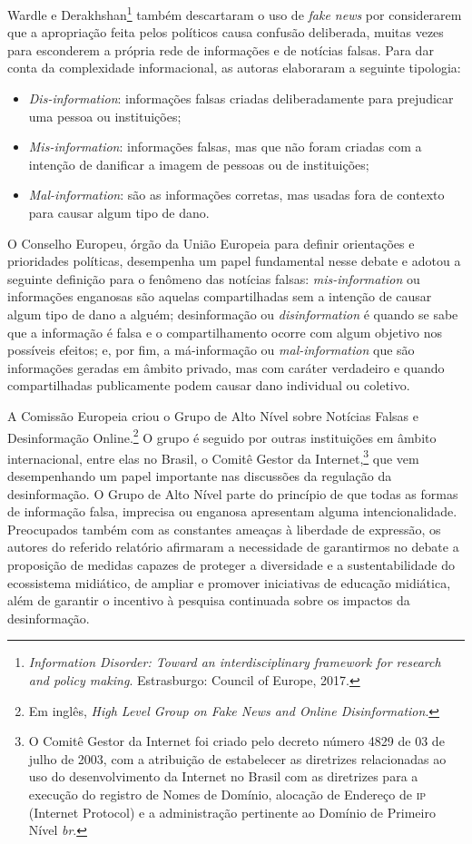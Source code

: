 Wardle e Derakhshan\footnote{\textit{Information
Disorder: Toward an interdisciplinary framework for research and policy
making}. Estrasburgo: Council of Europe, 2017.} também descartaram o uso de \textit{fake news}
por considerarem que a apropriação feita pelos políticos causa confusão
deliberada, muitas vezes para esconderem a própria rede de informações e
de notícias falsas. Para dar conta da complexidade informacional, as
autoras elaboraram a seguinte tipologia:

\begin{itemize}
\item \textit{Dis-information}: informações falsas criadas deliberadamente para
prejudicar uma pessoa ou instituições;

\item \textit{Mis-information}: informações falsas, mas que não foram criadas
com a intenção de danificar a imagem de pessoas ou de instituições;

\item \textit{Mal-information}: são as informações corretas, mas usadas fora de
contexto para causar algum tipo de dano.
\end{itemize}

O Conselho Europeu, órgão da União Europeia para definir orientações e
prioridades políticas, desempenha um papel fundamental nesse debate e
adotou a seguinte definição para o fenômeno das notícias falsas:
\textit{mis-information} ou informações enganosas são aquelas
compartilhadas sem a intenção de causar algum tipo de dano a alguém;
desinformação ou \textit{disinformation} é quando se sabe que a informação
é falsa e o compartilhamento ocorre com algum objetivo nos possíveis
efeitos; e, por fim, a má-informação ou \textit{mal-information} que são
informações geradas em âmbito privado, mas com caráter verdadeiro e
quando compartilhadas publicamente podem causar dano individual ou
coletivo.

A Comissão Europeia criou o Grupo de Alto Nível sobre Notícias Falsas e
Desinformação Online.\footnote{Em inglês, \textit{High Level Group on Fake News and Online
Disinformation}.} O grupo é seguido por outras instituições em âmbito
internacional, entre elas no Brasil, o Comitê Gestor da
Internet,\footnote{O Comitê Gestor da Internet foi criado pelo decreto
  número 4829 de 03 de julho de 2003, com a atribuição de estabelecer as diretrizes
  relacionadas ao uso do desenvolvimento da Internet no Brasil com as
  diretrizes para a execução do registro de Nomes de Domínio, alocação
  de Endereço de \textsc{ip} (Internet Protocol) e a administração pertinente ao
  Domínio de Primeiro Nível \textit{br}.} que vem desempenhando um papel
importante nas discussões da regulação da desinformação. O Grupo de Alto
Nível parte do princípio de que todas as formas de informação falsa,
imprecisa ou enganosa apresentam alguma intencionalidade. Preocupados
também com as constantes ameaças à liberdade de expressão, os autores do
referido relatório afirmaram a necessidade de garantirmos no debate a
proposição de medidas capazes de proteger a diversidade e a
sustentabilidade do ecossistema midiático, de ampliar e promover
iniciativas de educação midiática, além de garantir o incentivo à
pesquisa continuada sobre os impactos da desinformação.

